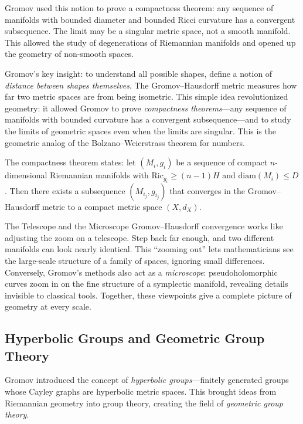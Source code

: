 Gromov used this notion to prove a compactness theorem: any sequence of manifolds with bounded diameter and bounded Ricci curvature has a convergent subsequence. The limit may be a singular metric space, not a smooth manifold. This allowed the study of degenerations of Riemannian manifolds and opened up the geometry of non-smooth spaces.

\begin{bigidea}
Gromov's key insight: to understand all possible shapes, define a notion of \emph{distance between shapes themselves}. The Gromov--Hausdorff metric measures how far two metric spaces are from being isometric. This simple idea revolutionized geometry: it allowed Gromov to prove \emph{compactness theorems}---any sequence of manifolds with bounded curvature has a convergent subsequence---and to study the limits of geometric spaces even when the limits are singular. This is the geometric analog of the Bolzano--Weierstrass theorem for numbers.
\end{bigidea}

The compactness theorem states: let $(M_i, g_i)$ be a sequence of compact $n$-dimensional Riemannian manifolds with $\mathrm{Ric}_{g_i} \geq (n-1)H$ and $\mathrm{diam}(M_i) \leq D$. Then there exists a subsequence $(M_{i_j}, g_{i_j})$ that converges in the Gromov--Hausdorff metric to a compact metric space $(X, d_X)$.

\begin{analogy}{The Telescope and the Microscope}
Gromov--Hausdorff convergence works like adjusting the zoom on a telescope. Step back far enough, and two different manifolds can look nearly identical. This ``zooming out'' lets mathematicians see the large-scale structure of a family of spaces, ignoring small differences. Conversely, Gromov's methods also act as a \emph{microscope}: pseudoholomorphic curves zoom in on the fine structure of a symplectic manifold, revealing details invisible to classical tools. Together, these viewpoints give a complete picture of geometry at every scale.
\end{analogy}

\subsection{Hyperbolic Groups and Geometric Group Theory}

Gromov introduced the concept of \emph{hyperbolic groups}---finitely generated groups whose Cayley graphs are hyperbolic metric spaces. This brought ideas from Riemannian geometry into group theory, creating the field of \emph{geometric group theory}.

